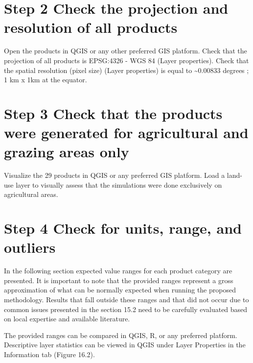 \documentclass[
  10pt,
  b5paper,
]{book}
\begin{document}
\hypertarget{step-2-check-the-projection-and-resolution-of-all-products}{%
\section*{Step 2 Check the projection and resolution of all products}\label{step-2-check-the-projection-and-resolution-of-all-products}}

Open the products in QGIS or any other preferred GIS platform. Check that the projection of all products is EPSG:4326 - WGS 84 (Layer properties). Check that the spatial resolution (pixel size) (Layer properties) is equal to \textasciitilde0.00833 degrees ; 1 km x 1km at the equator.

\hypertarget{step-3-check-that-the-products-were-generated-for-agricultural-and-grazing-areas-only}{%
\section*{Step 3 Check that the products were generated for agricultural and grazing areas only}\label{step-3-check-that-the-products-were-generated-for-agricultural-and-grazing-areas-only}}

Visualize the 29 products in QGIS or any preferred GIS platform. Load a land-use layer to visually assess that the simulations were done exclusively on agricultural areas.

\hypertarget{step-4-check-for-units-range-and-outliers}{%
\section*{Step 4 Check for units, range, and outliers}\label{step-4-check-for-units-range-and-outliers}}

In the following section expected value ranges for each product category are presented. It is important to note that the provided ranges represent a gross approximation of what can be normally expected when running the proposed methodology. Results that fall outside these ranges and that did not occur due to common issues presented in the section 15.2 need to be carefully evaluated based on local expertise and available literature.

The provided ranges can be compared in QGIS, R, or any preferred platform. Descriptive layer statistics can be viewed in QGIS under Layer Properties in the Information tab (Figure 16.2).
\end{document}
